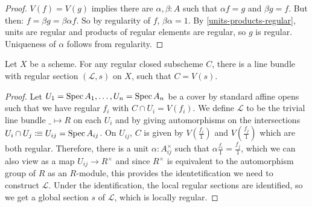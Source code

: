 \begin{proof}
  $V(f)=V(g)$ implies there are $\alpha,\beta:A$ such that
  $\alpha f = g$ and $\beta g = f$.
  But then: $f=\beta g=\beta\alpha f$.
  So by regularity of $f$, $\beta\alpha=1$.
  By \cref{units-products-regular}, units are regular and products of regular elements are regular,
  so $g$ is regular.
  Uniqueness of $\alpha$ follows from regularity.
\end{proof}

\begin{theorem}%
  Let $X$ be a scheme.
  For any regular closed subscheme $C$,
  there is a line bundle with regular section $(\mathcal L,s)$ on $X$,
  such that $C=V(s)$.
\end{theorem}

\begin{proof}
  Let $U_1=\operatorname{Spec} A_1,\dots,U_n=\operatorname{Spec} A_n$ be a cover by standard  affine opens such that we have
  regular $f_i$ with $C\cap U_i=V(f_i)$. 
  We define $\mathcal L$ to be the trivial line bundle $\_\mapsto R$ on each $U_i$
  and by giving automorphisms on the intersections $U_i\cap U_j\vcentcolon\mspace{-1.2mu}\equiv U_{ij}=\operatorname{Spec} A_{ij}$.
  On $U_{ij}$, $C$ is given by $V(\frac{f_i}{1})$ and $V(\frac{f_j}{1})$ which are both regular.
  Therefore, there is a unit $\alpha:A_{ij}^\times$ such that $\alpha\frac{f_i}{1}=\frac{f_j}{1}$,
  which we can also view as a map $U_{ij}\to R^\times$ and since $R^\times$
  is equivalent to the automorphism group of $R$ as an $R$-module,
  this provides the identetification we need to construct $\mathcal L$.
  Under the identification, the local regular sections are identified, so we get a global section $s$ of $\mathcal L$,
  which is locally regular.
\end{proof}

